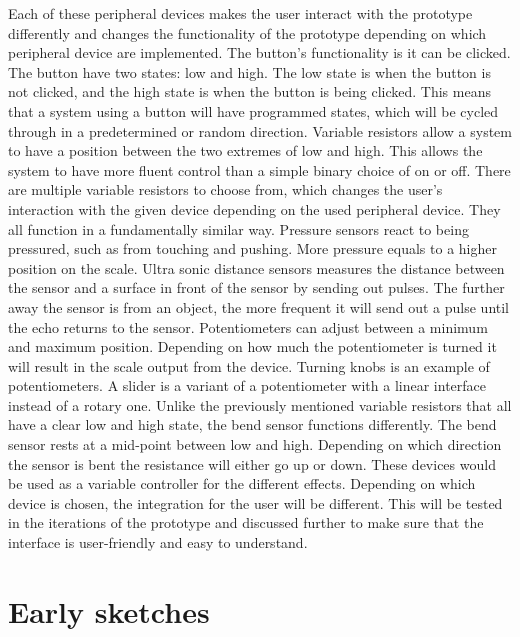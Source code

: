 Each of these peripheral devices makes the user interact with the prototype differently and changes the functionality of the prototype depending on which peripheral device are implemented.
The button's functionality is it can be clicked. The button have two states: low and high. The low state is when the button is not clicked, and the high state is when the button is being clicked. This means that a system using a button will have programmed states, which will be cycled through in a predetermined or random direction.
Variable resistors allow a system to have a position between the two extremes of low and high. This allows the system to have more fluent control than a simple binary choice of on or off. There are multiple variable resistors to choose from, which changes the user's interaction with the given device depending on the used peripheral device.  They all function in a fundamentally similar way. 
Pressure sensors react to being pressured, such as from touching and pushing. More pressure equals to a higher position on the scale.
Ultra sonic distance sensors measures the distance between the sensor and a surface in front of the sensor by sending out pulses. The further away the sensor is from an object, the more frequent it will send out a pulse until the echo returns to the sensor. 
Potentiometers can adjust between a minimum and maximum position. Depending on how much the potentiometer is turned it will result in the scale output from the device. Turning knobs is an example of potentiometers. A slider is a variant of a potentiometer with a linear interface instead of a rotary one.
Unlike the previously mentioned variable resistors that all have a clear low and high state, the bend sensor functions differently. The bend sensor rests at a mid-point between low and high. Depending on which direction the sensor is bent the resistance will either go up or down.
These devices would be used as a variable controller for the different effects. Depending on which device is chosen, the integration for the user will be different. This will be tested in the iterations of the prototype and discussed further to make sure that the interface is user-friendly and easy to understand. 


\section{Early sketches}


